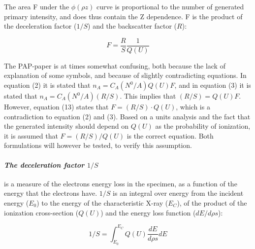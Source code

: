 The area F under the $\phi(\rho z)$ curve is proportional to the number of generated primary intensity, and does thus contain the Z dependence.
F is the product of the deceleration factor ($1/S$) and the backscatter factor ($R$):

\begin{equation}
    \label{eq:theory:quantitative:pap:calculation_of_F:F}
    F = \frac{R}{S}   \frac{1}{Q(U)}
\end{equation}

The PAP-paper is at times somewhat confusing, both because the lack of explanation of some symbols, and because of slightly contradicting equations.
In equation (2) it is stated that $n_A = C_A (N^0/A) Q(U) F$, and in equation (3) it is stated that $n_A = C_A (N^0/A) (R/S)$.
This implies that $(R/S) = Q(U) F$.
However, equation (13) states that $F = (R/S) \cdot Q(U)$, which is a contradiction to equation (2) and (3).
Based on a units analysis and the fact that the generated intensity should depend on $Q(U)$ as the probability of ionization, it is assumed that $F = (R/S) / Q(U)$ is the correct equation.
Both formulations will however be tested, to verify this assumption.



\paragraph*{\emph{The deceleration factor $1/S$}} is a measure of the electrons energy loss in the specimen, as a function of the energy that the electrons have.
$1/S$ is an integral over energy from the incident energy ($E_0$) to the energy of the characteristic X-ray ($E_C$), of the product of the ionization cross-section ($Q(U)$) and the energy loss function ($dE/d\rho s$):

\begin{equation}
    \label{eq:theory:quantitative:pap:calculation_of_F:S}
    1/S = \int_{E_0}^{E_C} Q(U)\frac{dE}{d\rho s} dE
\end{equation}

